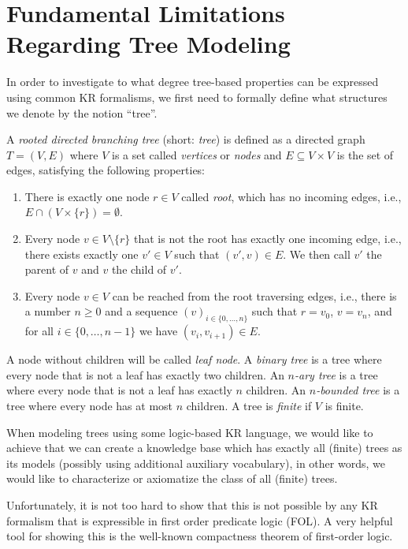 \section{Fundamental Limitations Regarding Tree Modeling}\label{sec:tree-limits}

In order to investigate to what degree tree-based properties can be expressed using common KR formalisms, we first need to formally define what structures we denote by the notion ``tree''.

\begin{definition}\label{def:tree} A \emph{rooted directed branching tree} (short: \emph{tree}) is defined as a directed graph $T=(V,E)$ where $V$ is a set called \emph{vertices} or \emph{nodes} and $E\subseteq V \times V$ is the set of edges, satisfying the following properties:
\begin{enumerate}
\item There is exactly one node $r \in V$ called \emph{root}, which has no incoming edges, i.e., $E \cap (V \times \{r\}) = \emptyset$.
\item Every node $v \in V \setminus \{r\}$ that is not the root has exactly one incoming edge, i.e., there exists exactly one $v' \in V$ such that $(v',v)\in E$. We then call $v'$ the parent of $v$ and $v$ the child of $v'$.
\item Every node $v \in V$ can be reached from the root traversing edges, i.e., there is a number $n\geq 0$ and a sequence $(v)_{i\in \{0,\ldots,n\}}$ such that $r=v_0$, $v=v_n$, and for all $i\in \{0,\ldots,n-1\}$ we have $(v_i,v_{i+1})\in E$.
\end{enumerate}
A node without children will be called \emph{leaf {node}}. A \emph{binary tree} is a tree where every node that is not a leaf has exactly two children. An \emph{$n$-ary tree} is a tree where every node that is not a leaf has exactly $n$ children. An \emph{$n$-bounded tree} is a tree where every node has at most $n$ children.  A tree is \emph{finite} if $V$ is finite.
\end{definition}

When modeling trees using some logic-based KR language, we would like to achieve that we can create a knowledge base which has exactly all (finite) trees as its models (possibly using additional auxiliary vocabulary), in other words, we would like to characterize or axiomatize the class of all (finite) trees.

Unfortunately, it is not too hard to show that this is not possible by any KR formalism that is expressible in first order predicate logic (FOL). A very helpful tool for showing this is the well-known compactness theorem of first-order logic\cite{compactness}.

